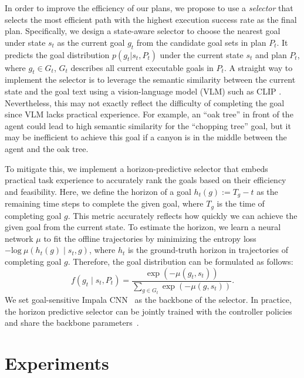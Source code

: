 \documentclass{article}
\begin{document}
In order to improve the efficiency of our plans, we propose to use a \textit{selector} that selects the most efficient path with the highest execution success rate as the final plan.
Specifically, we design a state-aware selector to choose the nearest goal under state $s_t$ as the current goal $g_t$ from the candidate goal sets in plan $P_t$.
It predicts the goal distribution $p(g_t |s_t, P_t)$ under the current state $s_t$ and plan $P_t$, where $g_t \in G_t$, $G_t$ describes all current executable goals in $P_t$. A straight way to implement the selector is to leverage the semantic similarity between the current state and the goal text using a vision-language model (VLM) such as CLIP \cite{clip}. Nevertheless, this may not exactly reflect the difficulty of completing the goal since VLM lacks practical experience. For example, an ``oak tree'' in front of the agent could lead to high semantic similarity for the ``chopping tree'' goal, but it may be inefficient to achieve this goal if a canyon is in the middle between the agent and the oak tree. 

To mitigate this, we implement a horizon-predictive selector that embeds practical task experience to accurately rank the goals based on their efficiency and feasibility. 
Here, we define the horizon of a goal $h_t(g) := T_g - t$  as the remaining time steps to complete the given goal, where $T_g$ is the time of completing goal $g$. 
This metric accurately reflects how quickly we can achieve the given goal from the current state. To estimate the horizon, we learn a neural network $\mu$ to fit the offline trajectories by minimizing the entropy loss $-\text{log}\ \mu(h_t(g) \mid s_t, g)$, where $h_t$ is the ground-truth horizon in trajectories of completing goal $g$. Therefore, the goal distribution can be formulated as follows:
\begin{equation}
    f(g_t \mid s_t,P_t) = \frac{\exp(-\mu(g_t, s_t))}{\sum_{g\in G_t} \exp(-\mu(g, s_t))}.
\end{equation}
\vskip -0.1in
We set goal-sensitive Impala CNN~\cite{shaofei} as the backbone of the selector. In practice, the horizon predictive selector can be jointly trained with the controller policies and share the backbone parameters~\cite{shaofei}.


\section{Experiments}
\end{document}
